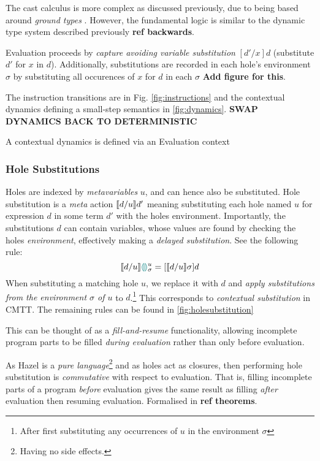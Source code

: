 The cast calculus is more complex as discussed previously, due to being based around \textit{ground types} . However, the fundamental logic is similar to the dynamic type system described previously \textbf{ref backwards}.


Evaluation proceeds by \textit{capture avoiding variable substitution} $[d'/x]d$ (substitute $d'$ for $x$ in $d$). Additionally, substitutions are recorded in each hole's environment $\sigma$ by substituting all occurences of $x$ for $d$ in each $\sigma$ \textbf{Add figure for this}. 

The instruction transitions are in Fig. \ref{fig:instructions} and the contextual dynamics defining a small-step semantics in \ref{fig:dynamics}. \textbf{SWAP DYNAMICS BACK TO DETERMINISTIC}

A contextual dynamics is defined via an Evaluation context

\subsubsection{Hole Substitutions}
Holes are indexed by \textit{metavariables} $u$, and can hence also be substituted. Hole substitution is a \textit{meta} action $\llbracket d/u \rrbracket d'$ meaning substituting each hole named $u$ for expression $d$ in some term $d'$ with the holes environment. Importantly, the substitutions $d$ can contain variables, whose values are found by checking the holes \textit{environment}, effectively making a \textit{delayed substitution}. See the following rule:
 \[\llbracket d/u \rrbracket {\color{teal}\llparenthesis}  {\color{teal}\rrparenthesis}^u_\sigma = [\llbracket d/u \rrbracket \sigma]d\]
When substituting a matching hole $u$, we replace it with $d$ and \textit{apply substitutions from the environment $\sigma$ of $u$} to $d$.\footnote{After first substituting any occurrences of $u$ in the environment $\sigma$} This corresponds to \textit{contextual substitution} in CMTT. The remaining rules can be found in \ref{fig:holesubstitution}
 
 This can be thought of as a \textit{fill-and-resume} functionality, allowing incomplete program parts to be filled \textit{during evaluation} rather than only before evaluation.

As Hazel is a \textit{pure language}\footnote{Having no side effects.} and as holes act as closures, then performing hole substitution is \textit{commutative} with respect to evaluation. That is, filling incomplete parts of a program \textit{before} evaluation gives the same result as filling \textit{after} evaluation then resuming evaluation. Formalised in \textbf{ref theorems}.

